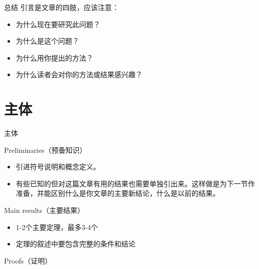 \documentclass[13pt]{ctexbeamer}
\begin{document}
\begin{frame}{总结}
引言是文章的四肢，应该注意：
\begin{itemize}
    \item 为什么现在要研究此问题？
    \item 为什么是这个问题？
    \item 为什么用你提出的方法？
    \item 为什么读者会对你的方法或结果感兴趣？
    \end{itemize}

\end{frame}


\section{主体}

\begin{frame}{主体}




	Preliminaries（预备知识）
	\begin{itemize}
		\item  引进符号说明和概念定义。
		\item  有些已知的但对这篇文章有用的结果也需要单独引出来。这样做是为下一节作准备，并能区别什么是你文章的主要新结论，什么是以前的结果。
	\end{itemize}
	Main results（主要结果）
		\begin{itemize}
		\item  1-2个主要定理，最多3-4个
		\item 定理的叙述中要包含完整的条件和结论
	\end{itemize}

Proofs（证明）
\end{frame}


	\setcounter{tocdepth}{2}
\frame{\tableofcontents[currentsection]}
\end{document}

